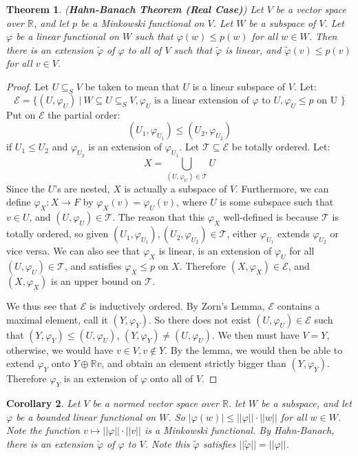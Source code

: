 \documentclass[a4paper,12pt]{report}
\newcommand{\mc}[1]{\mathcal{#1}}
\newcommand{\sse} {\subseteq}
\newcommand{\vphi} {\varphi}
\newtheorem{theorem}{Theorem}[section]
\newtheorem{corollary}[theorem]{Corollary}
\begin{document}
	\begin{theorem}
	\emph{(\textbf{Hahn-Banach Theorem (Real Case)})}
	Let $V$ be a vector space over $\mathbb{R}$, and let $p$ be a Minkowski functional on $V$. Let $W$ be a subspace of $V$. Let $\vphi$ be a linear functional on $W$ such that $\vphi(w) \leq p(w)$ for all $w \in W$. Then there is an extension $\tilde{\vphi}$ of $\vphi$ to all of $V$ such that $\tilde{\vphi}$ is linear, and $\tilde{\vphi}(v) \leq p(v)$ for all $v \in V$.
	\end{theorem}
	\begin{proof}
	Let $U \sse_S V$ be taken to mean that $U$ is a linear subspace of $V$.
	Let:
	\[ \mc{E} = \bigg\{ (U, \vphi_U) ~\big|~ W \sse U \sse_S V, \vphi_U \text{ is a linear extension of } \vphi \text{ to } U, \vphi_U \leq p \text{ on U } \bigg\} \]
	Put on $\mc{E}$ the partial order:
	\[ (U_1, \vphi_{U_1}) \leq (U_2, \vphi_{U_2}) \]
	if $U_1 \leq U_2$ and $\vphi_{U_2}$ is an extension of $\vphi_{U_1}$. Let $\mc{T} \sse \mc{E}$ be totally ordered. Let:
	\[ X = \bigcup_{(U, \vphi_U) \in \mc{T}} U \]
	Since the $U$'s are nested, $X$ is actually a subspace of $V$. Furthermore, we can define $\vphi_X : X \rightarrow F$ by $\vphi_X(v) = \vphi_U(v)$, where $U$ is some subspace such that $v \in U$, and $(U, \vphi_U) \in \mc{T}$. The reason that this $\vphi_X$ well-defined is because $\mc{T}$ is totally ordered, so given $(U_1, \vphi_{U_1}), (U_2, \vphi_{U_2}) \in \mc{T}$, either $\vphi_{U_1}$ extends $\vphi_{U_2}$ or vice versa. We can also see that $\vphi_X$ is linear, is an extension of $\vphi_U$ for all $(U, \vphi_U) \in \mc{T}$, and satisfies $\vphi_X \leq p$ on $X$. Therefore $(X, \vphi_X) \in \mc{E}$, and $(X, \vphi_X)$ is an upper bound on $\mc{T}$.
	
	We thus see that $\mc{E}$ is inductively ordered. By Zorn's Lemma, $\mc{E}$ contains a maximal element, call it $(Y, \vphi_Y)$. So there does not exist $(U, \vphi_U) \in \mc{E}$ such that $(Y, \vphi_Y) \leq (U, \vphi_U)$, $(Y, \vphi_Y) \neq (U, \vphi_U)$. We then must have $V = Y$, otherwise, we would have $v \in V, v \notin Y$. By the lemma, we would then be able to extend $\vphi_Y$ onto $Y \oplus \mathbb{R}v$, and obtain an element strictly bigger than $(Y, \vphi_Y)$. Therefore $\vphi_Y$ is an extension of $\vphi$ onto all of $V$.
	\end{proof}
	
	\begin{corollary}
	Let $V$ be a normed vector space over $\mathbb{R}$. let $W$ be a subspace, and let $\vphi$ be a bounded linear functional on $W$. So $|\vphi(w)| \leq ||\vphi|| \cdot ||w||$ for all $w \in W$. Note the function $v \mapsto ||\vphi|| \cdot ||v||$ is a Minkowski functional. By Hahn-Banach, there is an extension $\tilde{\vphi}$ of $\vphi$ to $V$. Note this $\tilde{\vphi}$ satisfies $||\tilde{\vphi}|| = ||\vphi||$. 
	\end{corollary}
	
\end{document}
